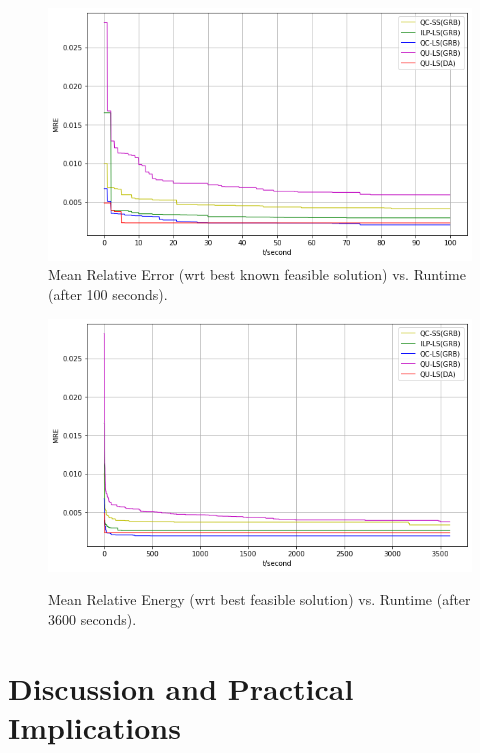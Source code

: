 \documentclass[preprint,12pt]{elsarticle}
\begin{document}
\begin{figure}[t]%
	
	\includegraphics[width=\textwidth]{Figures/MRE_100s_DA3_NEW.png}  
	\caption{Mean Relative Error (wrt best known feasible solution) vs. Runtime (after 100 seconds).}
	
	\label{fig:results1}%
\end{figure}

\begin{figure}[t]%
	
	\includegraphics[width=\textwidth]{Figures/MRE_3600s_DA3.png}   \\%
	\caption{Mean Relative Energy (wrt best feasible solution) vs. Runtime (after 3600 seconds).}%
	
	\label{fig:results2}%
\end{figure}



\section{Discussion and Practical Implications}
\label{sec:discussion}
\end{document}
